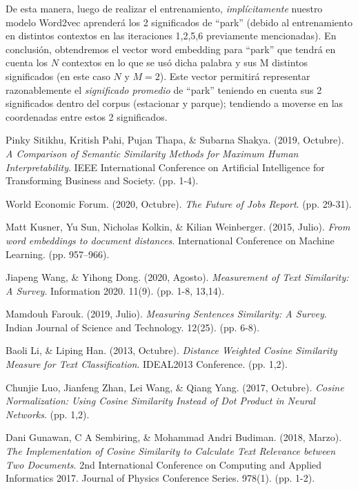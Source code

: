 \documentclass[12pt,a4paper]{article}
\begin{document}
\begin{sloppypar}
De esta manera, luego de realizar el entrenamiento, \textit{implícitamente} nuestro modelo Word2vec aprenderá los 2 significados de “park” (debido al entrenamiento en distintos contextos en las iteraciones 1,2,5,6 previamente mencionadas). En conclusión, obtendremos el vector word embedding para “park” que tendrá en cuenta los $N$ contextos en lo que se usó dicha palabra y sus M distintos significados (en este caso $N$ y $M = 2$). Este vector permitirá representar razonablemente el \textit{significado promedio} de “park” teniendo en cuenta sus 2 significados dentro del corpus (estacionar y parque); tendiendo a moverse en las coordenadas entre estos 2 significados.

\cleardoublepage

\begin{thebibliography}{9}

Pinky Sitikhu, Kritish Pahi, Pujan Thapa, \& Subarna Shakya. (2019, Octubre). \textit{A Comparison of Semantic Similarity Methods for Maximum Human Interpretability}. IEEE International Conference on Artificial Intelligence for Transforming Business and Society. (pp. 1-4).

World Economic Forum. (2020, Octubre). \textit{The Future of Jobs Report}. (pp. 29-31).

Matt Kusner, Yu Sun, Nicholas Kolkin, \& Kilian Weinberger. (2015, Julio). \textit{From word embeddings to document distances}. International Conference on Machine Learning. (pp. 957–966).

Jiapeng Wang, \& Yihong Dong. (2020, Agosto). \textit{Measurement of Text Similarity: A Survey}. Information 2020. 11(9). (pp. 1-8, 13,14).

Mamdouh Farouk. (2019, Julio). \textit{Measuring Sentences Similarity: A Survey}. Indian Journal of Science and Technology. 12(25). (pp. 6-8).

Baoli Li, \& Liping Han. (2013, Octubre). \textit{Distance Weighted Cosine Similarity Measure for Text Classification}. IDEAL2013 Conference. (pp. 1,2).

Chunjie Luo, Jianfeng Zhan, Lei Wang, \& Qiang Yang. (2017, Octubre). \textit{Cosine Normalization: Using Cosine Similarity Instead of Dot Product in Neural Networks}. (pp. 1,2).

Dani Gunawan, C A Sembiring, \& Mohammad Andri Budiman. (2018, Marzo). \textit{The Implementation of Cosine Similarity to Calculate Text Relevance between Two Documents}. 2nd International Conference on Computing and Applied Informatics 2017. Journal of Physics Conference Series. 978(1). (pp. 1-2).


\end{thebibliography}
\end{sloppypar}
\end{document}
